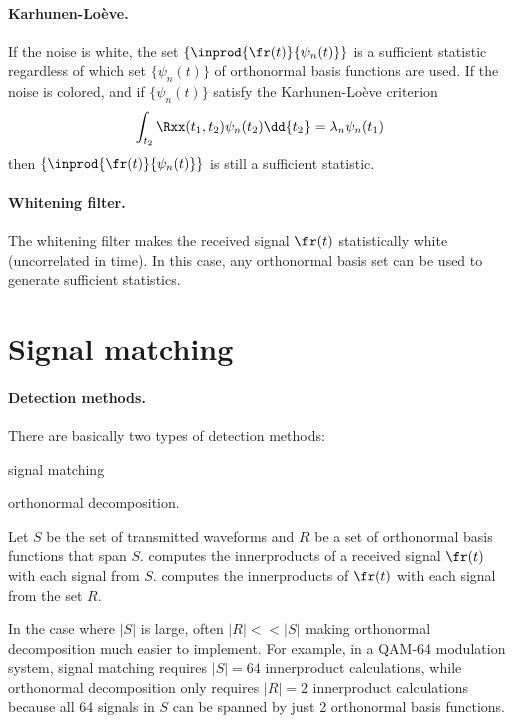 {\paragraph{Karhunen-Lo\`{e}ve.}
If the noise is white, the set $\{\inprod{\fr(t)}{\psi_n(t)}\}$
is a sufficient statistic regardless of which
set $\{\psi_n(t)\}$ of orthonormal basis functions are used.
If the noise is colored, and if $\{\psi_n(t)\}$ satisfy the
Karhunen-Lo\`{e}ve criterion
   \[ \int_{t_2}\Rxx(t_1,t_2)\psi_n(t_2)\dd{t_2} = \lambda_n \psi_n(t_1) \]
then $\{\inprod{\fr(t)}{\psi_n(t)}\}$ is still a sufficient statistic.

\paragraph{Whitening filter.}
The whitening filter makes the received signal $\fr(t)$ statistically white
(uncorrelated in time). In this case,
any orthonormal basis set can be used to generate sufficient statistics.




\section{Signal matching}
\paragraph{Detection methods.}
There are basically two types of detection methods:
\begin{enume}
   \item signal matching
   \item orthonormal decomposition.
\end{enume}

Let $S$ be the set of transmitted waveforms and
$R$ be a set of orthonormal basis functions that span $S$.
 computes the innerproducts of a
received signal $\fr(t)$ with each signal from $S$.
 computes the innerproducts of
$\fr(t)$ with each signal from the set $R$.

In the case where $|S|$ is large, often $|R|<<|S|$
making orthonormal decomposition much easier to implement.
For example, in a QAM-64 modulation system,
signal matching requires $|S|=64$ innerproduct calculations,
while orthonormal decomposition only requires $|R|=2$
innerproduct calculations because all 64 signals in $S$ can be spanned
by just 2 orthonormal basis functions.

}
